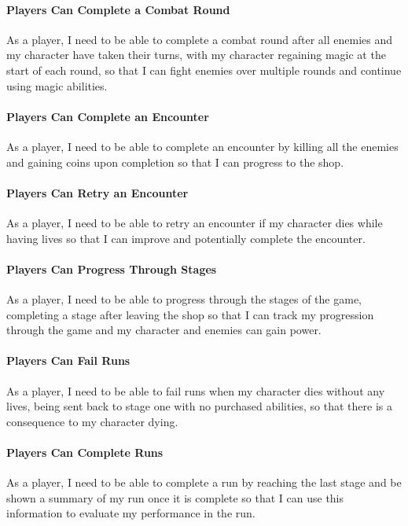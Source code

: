 \paragraph{Players Can Complete a Combat Round}
As a player, I need to be able to complete a combat round after all enemies and my character have taken their turns, with my character regaining magic at the start of each round, so that I can fight enemies over multiple rounds and continue using magic abilities.

\paragraph{Players Can Complete an Encounter}
As a player, I need to be able to complete an encounter by killing all the enemies and gaining coins upon completion so that I can progress to the shop.

\paragraph{Players Can Retry an Encounter}
As a player, I need to be able to retry an encounter if my character dies while having lives so that I can improve and potentially complete the encounter.

\paragraph{Players Can Progress Through Stages}
As a player, I need to be able to progress through the stages of the game, completing a stage after leaving the shop so that I can track my progression through the game and my character and enemies can gain power.

\paragraph{Players Can Fail Runs}
As a player, I need to be able to fail runs when my character dies without any lives, being sent back to stage one with no purchased abilities, so that there is a consequence to my character dying.

\paragraph{Players Can Complete Runs}
As a player, I need to be able to complete a run by reaching the last stage and be shown a summary of my run once it is complete so that I can use this information to evaluate my performance in the run.

